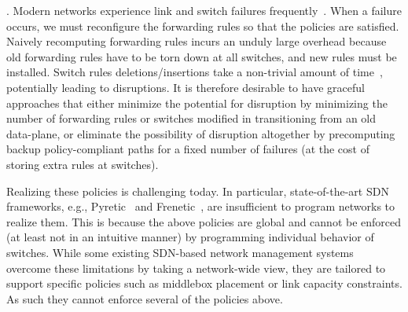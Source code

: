  
. Modern
   networks experience link and switch failures frequently~\cite{datacenterfailures}.
   When a failure occurs, we must reconfigure the forwarding rules
   so that the policies are satisfied. Naively recomputing
   forwarding rules incurs an unduly large overhead because old
   forwarding rules have to be torn down at all switches, and new
   rules must be installed. Switch rules deletions/insertions take a
   non-trivial amount of time~\cite{sdnlatency}, potentially
   leading to disruptions. It is therefore desirable to have graceful
   approaches that either minimize the potential for disruption by
   minimizing the number of forwarding rules or switches modified in
   transitioning from an old data-plane, or eliminate the possibility
   of disruption altogether by precomputing backup policy-compliant
   paths for a fixed number of failures (at the cost of storing extra
   rules at switches).
   


 Realizing these policies  is challenging today.
In particular, state-of-the-art SDN frameworks, e.g., Pyretic~\cite{pyretic}
and Frenetic~\cite{frenetic}, are insufficient to program networks to realize
them.  This is because the above policies are global and
cannot be enforced (at least not in an intuitive manner) by
programming individual behavior of switches.  While some existing
SDN-based network management systems~\cite{simple,merlin,oneswitch}
overcome these limitations by taking a network-wide view, they are
tailored to support specific policies such as middlebox placement or
link capacity constraints. As such they cannot enforce several of the
policies above.


